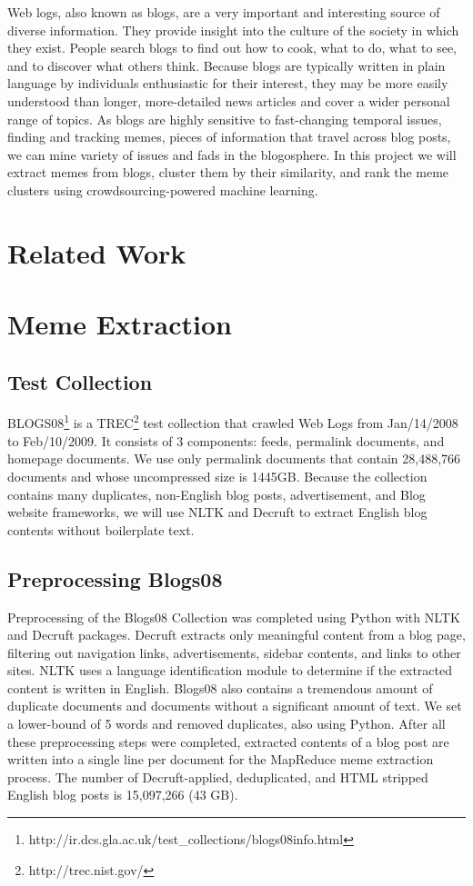 \documentclass{sig-alternate}
\begin{document}
Web logs, also known as blogs, are a very important and interesting source of diverse information. They provide insight into the culture of the society in which they exist. People search blogs to find out how to cook, what to do, what to see, and to discover what others think. Because blogs are typically written in plain language by individuals enthusiastic for their interest, they may be more easily understood than longer, more-detailed news articles and cover a wider personal range of topics. 
As blogs are highly sensitive to fast-changing temporal issues, finding and tracking memes, pieces of information that travel across blog posts, we can mine variety of issues and fads in the blogosphere. In this project we will extract memes from blogs, cluster them by their similarity, and rank the meme clusters using crowdsourcing-powered machine learning.

\section{Related Work}

\section{Meme Extraction}

\subsection{Test Collection}

BLOGS08\footnote{http://ir.dcs.gla.ac.uk/test\_collections/blogs08info.html} is a TREC\footnote{http://trec.nist.gov/} test collection that crawled Web Logs from Jan/14/2008 to Feb/10/2009. It consists of 3 components: feeds, permalink documents, and homepage documents. We use only permalink documents that contain 28,488,766 documents and whose uncompressed size is 1445GB. Because the collection contains many duplicates, non-English blog posts, advertisement, and Blog website frameworks, we will use NLTK and Decruft to extract English blog contents without boilerplate text.

\subsection{Preprocessing Blogs08}

Preprocessing of the Blogs08 Collection was completed using Python with NLTK and Decruft packages. Decruft extracts only meaningful content from a blog page, filtering out navigation links, advertisements, sidebar contents, and links to other sites. NLTK uses a language identification module to determine if the extracted content is written in English. Blogs08 also contains a tremendous amount of duplicate documents and documents without a significant amount of text. We set a lower-bound of 5 words and removed duplicates, also using Python. After all these preprocessing steps were completed, extracted contents of a blog post are written into a single line per document for the MapReduce meme extraction process. The number of Decruft-applied, deduplicated, and HTML stripped English blog posts is 15,097,266 (43 GB).
\end{document}
